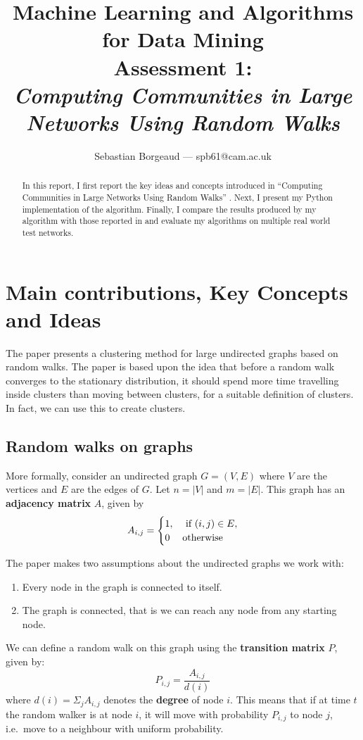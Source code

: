 \documentclass[12pt]{article}
\title{{\small{Machine Learning and Algorithms for Data Mining} \\
Assessment 1:} \\
\textit{Computing Communities in Large Networks Using Random Walks}}
\author{Sebastian Borgeaud --- spb61@cam.ac.uk}
\theoremstyle{definition}
\begin{document}
\maketitle

\begin{abstract}
	In this report, I first report the key ideas and concepts introduced in ``Computing Communities in Large Networks Using Random Walks'' \cite{pons2005computing}. Next, I present my Python implementation of the algorithm. Finally, I compare the results produced by my algorithm with those reported in \cite{pons2005computing} and evaluate my algorithms on multiple real world test networks.
	\end{abstract}

\section{Main contributions, Key Concepts and Ideas}
The paper presents a clustering method for large undirected graphs based on random walks. The paper is based upon the idea that before a random walk converges to the stationary distribution, it should spend more time travelling inside clusters than moving between clusters, for a suitable definition of clusters. In fact, we can use this to create clusters.

\subsection{Random walks on graphs}
More formally, consider an undirected graph $G=(V,E)$ where $V$ are the vertices and $E$ are the edges of $G$. Let $n = |V|$ and $m = |E|$. This graph has an \textbf{adjacency matrix} $A$, given by
\[ 
A_{i,j} = 
\begin{cases}
	1, 	&\textnormal{ if $(i,j) \in E$},\\
	0	&\textnormal{otherwise}\\
\end{cases}
\]

The paper makes two assumptions about the undirected graphs we work with:
\begin{enumerate}
	\item Every node in the graph is connected to itself.
	\item The graph is connected, that is we can reach any node from any starting node.
\end{enumerate}

We can define a random walk on this graph using the \textbf{transition matrix} $P$, given by:
\begin{equation}
	P_{i,j} = \frac{A_{i,j}}{d(i)}
\end{equation}
where $d(i) = \Sigma_j A_{i,j}$ denotes the \textbf{degree} of node $i$. This means that if at time $t$ the random walker is at node $i$, it will move with probability $P_{i,j}$ to node $j$, i.e.\ move to a neighbour with uniform probability.
\end{document}
